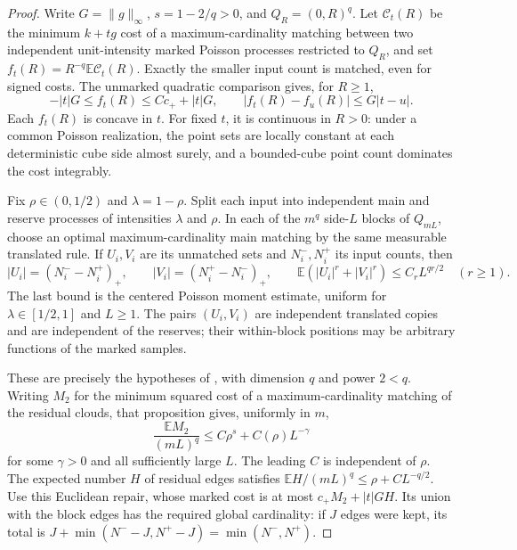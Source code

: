 \documentclass[11pt,reqno]{amsart}
\theoremstyle{definition}
\theoremstyle{remark}
\numberwithin{equation}{section}
\newcommand{\E}{\mathbb E}
\begin{document}
\begin{proof}
Write \(G=\|g\|_\infty\), \(s=1-2/q>0\), and
\(Q_R=(0,R)^q\). Let \(\mathcal C_t(R)\) be the minimum
\(k+t g\) cost of a maximum-cardinality matching between two
independent unit-intensity marked Poisson processes restricted to
\(Q_R\), and set \(f_t(R)=R^{-q}\E\mathcal C_t(R)\).
Exactly the smaller input count is matched, even for signed costs.
The unmarked quadratic comparison gives, for \(R\ge1\),
\[
-|t|G\le f_t(R)\le Cc_++|t|G,
\qquad |f_t(R)-f_u(R)|\le G|t-u|.
\]
Each \(f_t(R)\) is concave in \(t\). For fixed \(t\),
it is continuous in \(R>0\): under a common Poisson realization,
the point sets are locally constant at each deterministic cube side
almost surely, and a bounded-cube point count dominates the cost
integrably.

Fix \(\rho\in(0,1/2)\) and \(\lambda=1-\rho\). Split each
input into independent main and reserve processes of intensities
\(\lambda\) and \(\rho\). In each of the \(m^q\) side-\(L\)
blocks of \(Q_{mL}\), choose an optimal maximum-cardinality main
matching by the same measurable translated rule. If \(U_i,V_i\)
are its unmatched sets and \(N_i^-,N_i^+\) its input counts, then
\[
|U_i|=(N_i^--N_i^+)_+,
\qquad |V_i|=(N_i^+-N_i^-)_+,
\qquad
\E(|U_i|^r+|V_i|^r)\le C_rL^{qr/2}\quad(r\ge1).
\]
The last bound is the centered Poisson moment estimate, uniform
for \(\lambda\in[1/2,1]\) and \(L\ge1\).
The pairs \((U_i,V_i)\) are independent translated copies and
are independent of the reserves; their within-block positions may
be arbitrary functions of the marked samples.

These are precisely the hypotheses of
\cite[Proposition~6.5]{GoldmanTrevisan2023}, with dimension \(q\)
and power \(2<q\). Writing \(M_2\) for the minimum squared
cost of a maximum-cardinality matching of the residual clouds,
that proposition gives, uniformly in \(m\),
\[
\frac{\E M_2}{(mL)^q}\le C\rho^s+C(\rho)L^{-\gamma}
\]
for some \(\gamma>0\) and all sufficiently large \(L\).
The leading \(C\) is independent of \(\rho\). The expected
number \(H\) of residual edges satisfies
\(\E H/(mL)^q\le\rho+CL^{-q/2}\).
Use this Euclidean repair, whose marked cost is at most
\(c_+M_2+|t|GH\). Its union with the block edges has the required
global cardinality: if \(J\) edges were kept, its total is
\(J+\min(N^--J,N^+-J)=\min(N^-,N^+)\).


\end{proof}
\end{document}

